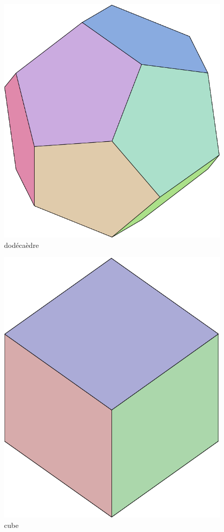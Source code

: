 \begin{figure}[ht]
   \centering
   \includegraphics[scale=0.25]{Eee09_4.pdf}
   \caption{dodécaèdre}
   \label{fig:4}
\end{figure}
\begin{figure}
   \centering
   \includegraphics[scale=0.25]{Eee09_5.pdf}
   \caption{cube}
   \label{fig:5}
\end{figure}
